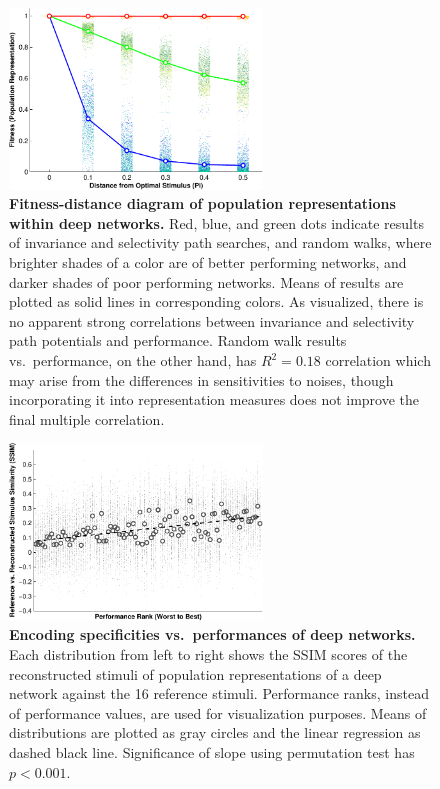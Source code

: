 \begin{figure}[H]
\centering \includegraphics[width=0.6\textwidth]{Figs/e_fig5a.pdf}
\caption{ 
{\bf Fitness-distance diagram of population representations within deep networks.} Red, blue, and green dots indicate results of invariance and selectivity path searches, and random walks, where brighter shades of a color are of better performing networks, and 
darker shades of poor performing networks. Means of results are plotted as solid lines in corresponding colors. As visualized, there is no apparent strong correlations between invariance and selectivity path potentials and performance. Random walk results vs.~performance, on the other hand, has $R^2 = 0.18$ correlation which may arise from the differences in sensitivities to noises, though incorporating it into representation measures does not improve the final multiple correlation.}
\label{fig:SFfda}
\end{figure}

\begin{figure}[H]
\centering \includegraphics[width=0.6\textwidth]{Figs/e_fig6b.pdf}
\caption{ 
{\bf Encoding specificities vs.~performances of deep networks.} Each distribution from left to right shows the SSIM scores of the reconstructed stimuli of population representations of a deep network against the 16 reference stimuli. Performance ranks, instead of performance values, are used for visualization purposes. Means of distributions are plotted as gray circles and the linear regression as dashed black line. Significance of slope using permutation test has $p < 0.001$.}
\label{fig:SFenc}
\end{figure}